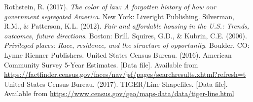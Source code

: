 \documentclass[paper=letter, fontsize=12pt]{scrartcl} %
\begin{document}
\begin{thebibliography}{9}
Rothstein, R. (2017). \textit{The color of law: A forgotten history of how our government segregated America}. New York: Liveright Publishing.
Silverman, R.M., \& Patterson, K.L. (2012). \textit{Fair and affordable housing in the U.S.: Trends, outcomes, future directions}. Boston: Brill.
Squires, G.D., \& Kubrin, C.E. (2006). \textit{Privileged places: Race, residence, and the structure of opportunity}. Boulder, CO: Lynne Rienner Publishers.
United States Census Bureau. (2016). American Community Survey 5-Year Estimates. [Data file]. Available from \href{https://factfinder.census.gov/faces/nav/jsf/pages/searchresults.xhtml?refresh=t}{https://factfinder.census.gov/faces/nav/jsf/pages/searchresults.xhtml?refresh=t}
United States Census Bureau. (2017). TIGER/Line Shapefiles. [Data file]. Available from \href{https://www.census.gov/geo/maps-data/data/tiger-line.html}{https://www.census.gov/geo/maps-data/data/tiger-line.html}
\end{thebibliography}
\end{document}
